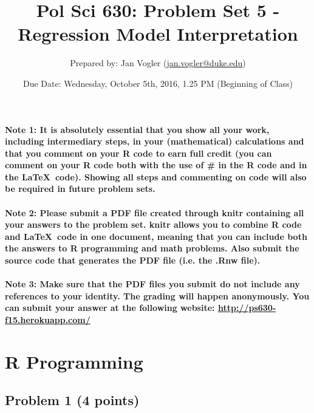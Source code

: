 \documentclass[12pt]{article}
\begin{document}
\title{Pol Sci 630: Problem Set 5 - Regression Model Interpretation}

\author{Prepared by: Jan Vogler (\href{mailto:jan.vogler@duke.edu}{jan.vogler@duke.edu})}

\date{Due Date: Wednesday, October 5th, 2016, 1.25 PM (Beginning of Class)}
 
\maketitle 



\paragraph{Note 1: It is absolutely essential that you show all your work, including intermediary steps, in your (mathematical) calculations and that you comment on your R code to earn full credit (you can comment on your R code both with the use of \# in the R code and in the \LaTeX \ code). Showing all steps and commenting on code will also be required in future problem sets.}

\paragraph{Note 2: Please submit a PDF file created through knitr containing all your answers to the problem set. knitr allows you to combine R code and \LaTeX \ code in one document, meaning that you can include both the answers to R programming and math problems. Also submit the source code that generates the PDF file (i.e. the .Rnw file).}

\paragraph{Note 3: Make sure that the PDF files you submit do not include any references to your identity. The grading will happen anonymously. You can submit your answer at the following website: \url{http://ps630-f15.herokuapp.com/}}



\section*{R Programming}

\subsection*{Problem 1 (4 points)}
\end{document}
